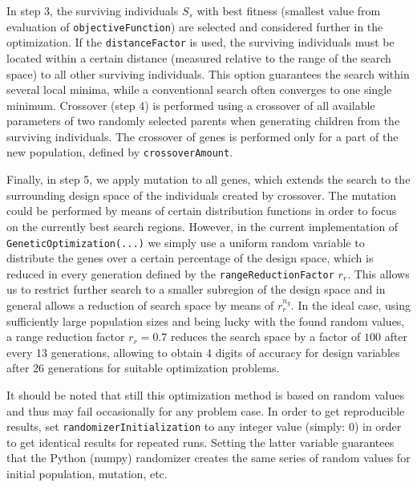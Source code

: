 In step 3, the surviving individuals $S_s$ with best fitness (smallest value from evaluation of \texttt{objectiveFunction}) are selected and considered further in the optimization. If the \texttt{distanceFactor} is used, the surviving individuals must be located within a certain distance (measured relative to the range of the search space) to all other surviving individuals. This option guarantees the search within several local minima, while a conventional search often converges to one single minimum.
Crossover (step 4)  is performed using a crossover of all available parameters of two randomly selected parents when generating children from the surviving individuals. The crossover of genes is performed only for a part of the new population, defined by \texttt{crossoverAmount}.

Finally, in step 5, we apply mutation to all genes, which extends the search to the surrounding design space of the individuals created by crossover. The mutation could be performed by means of certain distribution functions in order to focus on the currently best search regions. However, in the current implementation of \texttt{GeneticOptimization(...)} we simply use a uniform random variable to distribute the genes over a certain percentage of the design space, which is reduced in every generation defined by the \texttt{rangeReductionFactor} $r_r$. This allows us to restrict further search to a smaller subregion of the design space and in general allows a reduction of search space by means of $r_r^{n_g}$. In the ideal case, using sufficiently large population sizes and being lucky with the found random values, a range reduction factor $r_r=0.7$ reduces the search space by a factor of $100$ after every 13 generations, allowing to obtain 4 digits of accuracy for design variables after 26 generations for suitable optimization problems.

It should be noted that still this optimization method is based on random values and thus may fail occasionally for any problem case. In order to get reproducible results, set \texttt{randomizerInitialization} to any integer value (simply: 0) in order to get identical results for repeated runs. Setting the latter variable guarantees that the Python (numpy) randomizer creates the same series of random values for initial population, mutation, etc.




